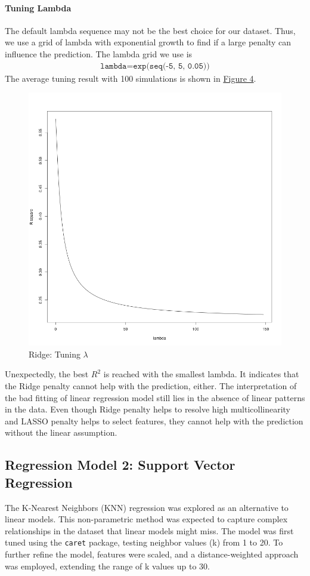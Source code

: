 \documentclass[8pt]{article}
\begin{document}
\paragraph{Tuning Lambda}
The default lambda sequence may not be the best choice for our dataset.
Thus, we use a grid of lambda with exponential growth to find 
if a large penalty can influence the prediction. The lambda grid we use is 
\begin{align*}
    \texttt{lambda} = \texttt{exp(seq(-5, 5, 0.05))}
\end{align*}
The average tuning result with 100 simulations is shown in \hyperref[fig:lambda]{Figure 4}.
\begin{figure}[H]
    \centering
    \includegraphics*[scale=0.25]{figures/lambda.png}
    \caption{Ridge: Tuning $\lambda$}
\label{fig:lambda}
\end{figure}
Unexpectedly, the best $R^2$ is reached with the smallest lambda. 
It indicates that the Ridge penalty cannot help with the prediction, either. 
The interpretation of the bad fitting of linear regression model still lies in the absence of linear patterns in the data.
Even though Ridge penalty helps to resolve high multicollinearity and LASSO penalty 
helps to select features, they cannot help with the prediction without the linear assumption.

\subsection{Regression Model 2: Support Vector Regression}
The K-Nearest Neighbors (KNN) regression was explored as an alternative to linear models. This non-parametric method was expected to capture complex relationships in the dataset that linear models might miss. The model was first tuned using the \texttt{caret} package, testing neighbor values (k) from 1 to 20. To further refine the model, features were scaled, and a distance-weighted approach was employed, extending the range of k values up to 30. 
\end{document}
